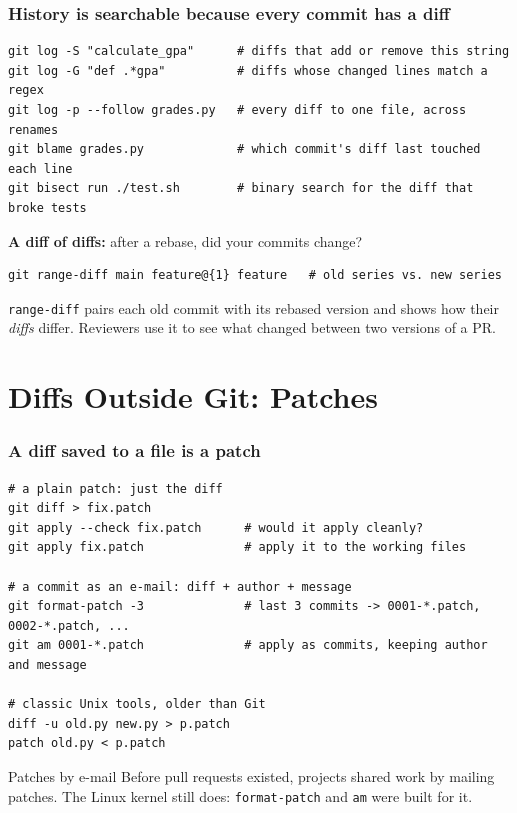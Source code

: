 \documentclass[aspectratio=169,10pt,compress]{beamer}
\newcommand{\cmd}[1]{\texttt{\color{gitred}#1}}
\begin{document}
\begin{frame}[t,fragile] \frametitle{History is searchable because every commit has a diff}
\begin{lstlisting}
git log -S "calculate_gpa"      # diffs that add or remove this string
git log -G "def .*gpa"          # diffs whose changed lines match a regex
git log -p --follow grades.py   # every diff to one file, across renames
git blame grades.py             # which commit's diff last touched each line
git bisect run ./test.sh        # binary search for the diff that broke tests
\end{lstlisting}

  \vspace{0.3em}
  \textbf{A diff of diffs:} after a rebase, did your commits change?
\begin{lstlisting}
git range-diff main feature@{1} feature   # old series vs. new series
\end{lstlisting}
  \small \cmd{range-diff} pairs each old commit with its rebased version and shows how their
  \emph{diffs} differ. Reviewers use it to see what changed between two versions of a PR.
\end{frame}

\section[Patches]{Diffs Outside Git: Patches}

\begin{frame}[t,fragile] \frametitle{A diff saved to a file is a patch}
\begin{lstlisting}
# a plain patch: just the diff
git diff > fix.patch
git apply --check fix.patch      # would it apply cleanly?
git apply fix.patch              # apply it to the working files

# a commit as an e-mail: diff + author + message
git format-patch -3              # last 3 commits -> 0001-*.patch, 0002-*.patch, ...
git am 0001-*.patch              # apply as commits, keeping author and message

# classic Unix tools, older than Git
diff -u old.py new.py > p.patch
patch old.py < p.patch
\end{lstlisting}

  \begin{block}{Patches by e-mail}
    Before pull requests existed, projects shared work by mailing patches.
    The Linux kernel still does: \texttt{format-patch} and \texttt{am} were built for it.
  \end{block}
\end{frame}
\end{document}
